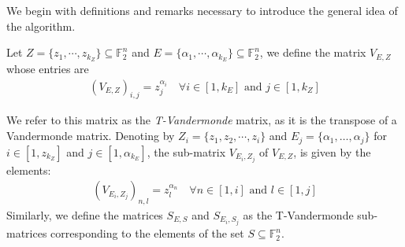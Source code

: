 \documentclass[11pt]{llncs}
\begin{document}
We begin with definitions and remarks necessary to introduce the general idea of the algorithm.




\begin{definition}\label{def:tVandermonde}
    Let $Z = \{z_1, \cdots, z_{k_Z}\} \subseteq \mathbb{F}_2^n$ and $E = \{\alpha_1, \cdots, \alpha_{k_E}\}\subseteq \mathbb{F}_2^n$, we define the matrix $V_{E,Z}$ whose entries are
    \begin{align*}
        \left(V_{E,Z}\right)_{i,j} = z_j^{\alpha_i} \quad \forall i\in[1,k_E] \mbox{ and } j\in[1, k_Z] 
    \end{align*}
    
  We refer to this matrix as the \textit{T-Vandermonde} matrix, as it is the transpose of a Vandermonde matrix.
    Denoting by $Z_i = \{z_1, z_2, \cdots, z_i\}$ and $E_j = \{\alpha_1, \dots, \alpha_j\}$ for $i\in[1,z_{k_Z}]$ and $j\in[1,\alpha_{k_E}]$, the sub-matrix $V_{E_i, Z_j}$ of $V_{E,Z}$, is given by the elements:
    \begin{align*}
        \left(V_{E_i,Z_j}\right)_{n,l} = z_l^{\alpha_n} \quad \forall n\in[1,i] \mbox{ and } l\in[1, j] 
    \end{align*}
    Similarly, we define the matrices $S_{E,S}$ and $S_{E_i, S_j}$ as the T-Vandermonde sub-matrices corresponding to the elements of the set $S\subseteq \mathbb{F}_2^n$.
\end{definition}
\end{document}
